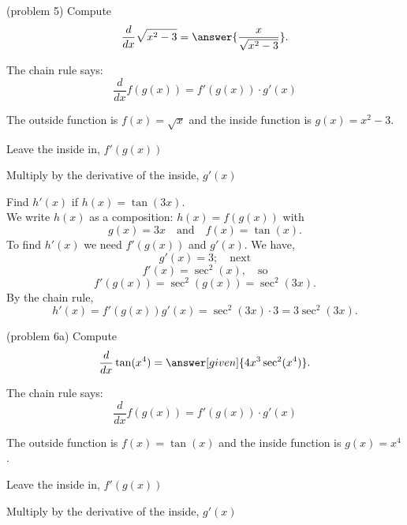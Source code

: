 \documentclass{ximera}
\begin{document}
\begin{problem}(problem 5)
  Compute
  \[
  \frac{d}{dx} \sqrt{x^2 - 3} = \answer{\frac{x}{\sqrt{x^2 - 3}}}.
  \]
  
    \begin{hint}
      The chain rule says:
      \[
      \frac{d}{dx} f(g(x)) = f'(g(x))\cdot g'(x)
      \]
    \end{hint}
    \begin{hint}
      The outside function is $f(x) = \sqrt{x}$ and the inside
      function is $g(x) = x^2 - 3$.
    \end{hint}
    
    \begin{hint}
		  Leave the inside in, $f'(g(x))$
		\end{hint}
		\begin{hint}
		  Multiply by the derivative of the inside, $g'(x)$
		\end{hint}
		
\end{problem}




\begin{example}[example 6]

Find $h'(x)$ if $h(x) = \tan(3x)$.\\
We write $h(x)$ as a composition: $h(x)=f(g(x))$ with 
\[
g(x) = 3x  \quad \text{and} \quad  f(x) =\tan(x).
\]
To find $h'(x)$ we need $f'(g(x))$ and $g'(x)$.  We have, 
\[
g'(x) =3; \quad \text{next} 
\]
\[
f'(x) =\sec^2(x) , \quad \text{so}
\]
\[
f'(g(x)) = \sec^2(g(x)) = \sec^2(3x).
\]
By the chain rule, 
\[
h'(x) = f'(g(x))g'(x) = \sec^2(3x) \cdot 3= 3\sec^2(3x).
\]
\end{example}


\begin{center}
\begin{foldable}
\end{foldable}
\end{center}


\begin{problem}(problem 6a)
  Compute
  \[
  \frac{d}{dx} \tan(x^4) = \answer[given]{4x^3 \sec^2(x^4)}.
  \]
  
    \begin{hint}
      The chain rule says:
      \[
      \frac{d}{dx} f(g(x)) = f'(g(x))\cdot g'(x)
      \]
    \end{hint}
    \begin{hint}
      The outside function is $f(x) = \tan(x)$ and the inside
      function is $g(x) = x^4$.
    \end{hint}
    \begin{hint}
		  Leave the inside in, $f'(g(x))$
		\end{hint}
		\begin{hint}
		  Multiply by the derivative of the inside, $g'(x)$
		\end{hint}
 	
\end{problem}
\end{document}
